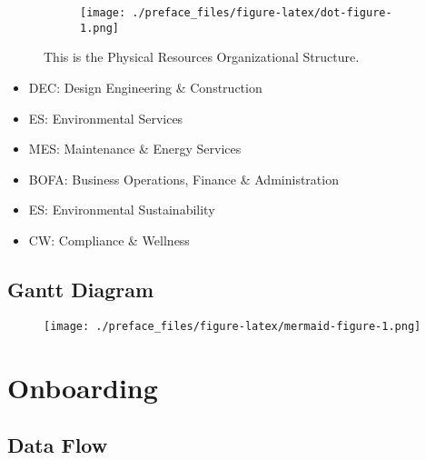 \documentclass[
  letterpaper,
  DIV=11,
  numbers=noendperiod,
  oneside]{scrreprt}
\begin{document}
\begin{figure}

{\centering 

\begin{figure}[H]

{\centering \texttt{[image: ./preface\_files/figure-latex/dot-figure-1.png]}

}

\end{figure}

}

\caption{\label{fig-pr-org}This is the Physical Resources Organizational
Structure.}

\end{figure}

\begin{itemize}
\item
  DEC: Design Engineering \& Construction
\item
  ES: Environmental Services
\item
  MES: Maintenance \& Energy Services
\item
  BOFA: Business Operations, Finance \& Administration
\item
  ES: Environmental Sustainability
\item
  CW: Compliance \& Wellness
\end{itemize}

\hypertarget{gantt-diagram}{%
\section*{Gantt Diagram}\label{gantt-diagram}}

\begin{figure}[H]

{\centering \texttt{[image: ./preface\_files/figure-latex/mermaid-figure-1.png]}

}

\end{figure}


\hypertarget{onboarding}{%
\chapter{Onboarding}\label{onboarding}}

\hypertarget{data-flow}{%
\section{Data Flow}\label{data-flow}}
\end{document}
